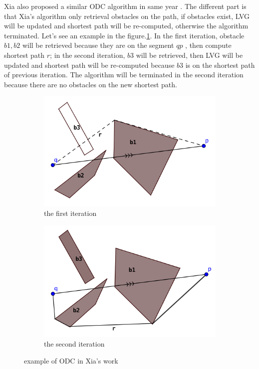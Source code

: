 Xia also proposed a similar ODC algorithm in same year \cite{xia2004fast}. The different part
is that Xia's algorithm only retrieval obstacles on the path, if obstacles exist,
LVG will be updated and shortest path will be re-computed, otherwise the algorithm terminated.
Let's see an example in the figure.\ref{bncod_odc}. In the first iteration, obstacle $b1, b2$ will
be retrieved because they are on the segment $qp$ , then compute shortest path $r$; in the
second iteration, $b3$ will be retrieved, then LVG will be updated and shortest path will be
re-computed because $b3$ is on the shortest path of previous iteration. The algorithm will
be terminated in the second iteration because there are no obstacles on the new shortest path.
\begin{figure}[htp]
\begin{subfigure}{.5\textwidth}
  \centering
  \includegraphics[width=.8\linewidth]{pic/bncod_odc1.PNG}
  \caption{the first iteration}
\end{subfigure}%
\begin{subfigure}{.5\textwidth}
  \centering
  \includegraphics[width=.8\linewidth]{pic/bncod_odc2.PNG}
  \caption{the second iteration}
\end{subfigure}
\caption{example of ODC in Xia's work}
\label{bncod_odc}
\end{figure}
